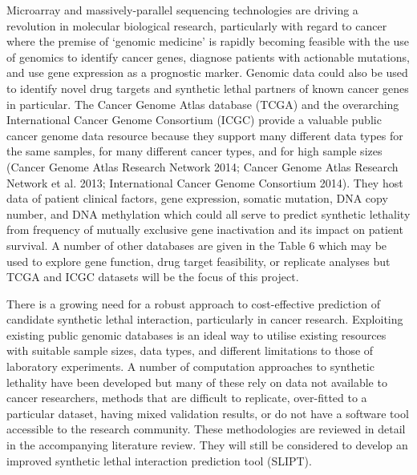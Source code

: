 Microarray and massively-parallel sequencing technologies are driving a revolution in molecular biological research, particularly with regard to cancer where the premise of ‘genomic medicine’ is rapidly becoming feasible with the use of genomics to identify cancer genes, diagnose patients with actionable mutations, and use gene expression as a prognostic marker.  Genomic data could also be used to identify novel drug targets and synthetic lethal partners of known cancer genes in particular.  The Cancer Genome Atlas database (TCGA) and the overarching International Cancer Genome Consortium (ICGC) provide a valuable public cancer genome data resource because they support many different data types for the same samples, for many different cancer types, and for high sample sizes (Cancer Genome Atlas Research Network 2014; Cancer Genome Atlas Research Network et al. 2013; International Cancer Genome Consortium 2014).  They host data of patient clinical factors, gene expression, somatic mutation, DNA copy number, and DNA methylation which could all serve to predict synthetic lethality from frequency of mutually exclusive gene inactivation and its impact on patient survival.  A number of other databases are given in the Table 6 which may be used to explore gene function, drug target feasibility, or replicate analyses but TCGA and ICGC datasets will be the focus of this project.

There is a growing need for a robust approach to cost-effective prediction of candidate synthetic lethal interaction, particularly in cancer research.  Exploiting existing public genomic databases is an ideal way to utilise existing resources with suitable sample sizes, data types, and different limitations to those of laboratory experiments.  A number of computation approaches to synthetic lethality have been developed but many of these rely on data not available to cancer researchers, methods that are difficult to replicate, over-fitted to a particular dataset, having mixed validation results, or do not have a software tool accessible to the research community.  These methodologies are reviewed in detail in the accompanying literature review.  They will still be considered to develop an improved synthetic lethal interaction prediction tool (SLIPT).  

